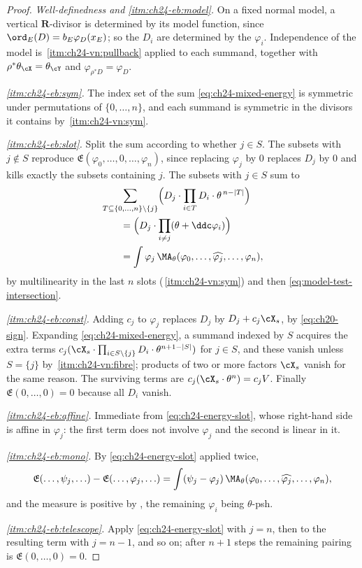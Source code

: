 \begin{proof}
\emph{Well-definedness and \cref{itm:ch24-eb:model}.}  On a fixed normal model,
a vertical $\mathbf R$-divisor is determined by its model function, since
$\ord_E(D)=b_E\varphi_D(x_E)$; so the $D_i$ are determined by the
$\varphi_i$.  Independence of the model is
\,\cref{itm:ch24-vn:pullback} applied to each
summand, together with $\rho^*\theta_{\cX}=\theta_{\cY}$ and
$\varphi_{\rho^*D}=\varphi_D$.

\emph{\cref{itm:ch24-eb:sym}.}  The index set of the sum
\eqref{eq:ch24-mixed-energy} is symmetric under permutations of
$\{0,\ldots,n\}$, and each summand is symmetric in the divisors it
contains by \,\cref{itm:ch24-vn:sym}.

\emph{\cref{itm:ch24-eb:slot}.}  Split the sum according to whether
$j\in S$.  The subsets with $j\notin S$ reproduce
$\mathfrak E(\varphi_0,\ldots,0,\ldots,\varphi_n)$, since replacing
$\varphi_j$ by $0$ replaces $D_j$ by $0$ and kills exactly the
subsets containing $j$.  The subsets with $j\in S$ sum to
\[
 \begin{aligned}
 &\sum_{T\subseteq\{0,\ldots,n\}\setminus\{j\}}
  \Bigl(D_j\cdot\prod_{i\in T}D_i\cdot\theta^{\,n-|T|}\Bigr)\\
 &\qquad=\Bigl(D_j\cdot\prod_{i\neq j}(\theta+\ddc\varphi_i)\Bigr)\\
 &\qquad=\int\varphi_j\,\MA_\theta
   (\varphi_0,\ldots,\widehat{\varphi_j},\ldots,\varphi_n),
 \end{aligned}
\]
by multilinearity in the last $n$ slots
(\,\cref{itm:ch24-vn:sym}) and then
\eqref{eq:model-test-intersection}.

\emph{\cref{itm:ch24-eb:const}.}  Adding $c_j$ to $\varphi_j$ replaces
$D_j$ by $D_j+c_j\cX_s$, by \eqref{eq:ch20-sign}.  Expanding
\eqref{eq:ch24-mixed-energy}, a summand indexed by $S$ acquires the extra
terms
$c_j(\cX_s\cdot\prod_{i\in S\setminus\{j\}}D_i\cdot\theta^{n+1-|S|})$ for
$j\in S$, and these vanish unless $S=\{j\}$ by
\,\cref{itm:ch24-vn:fibre}; products of two
or more factors $\cX_s$ vanish for the same reason.  The surviving terms
are $c_j(\cX_s\cdot\theta^n)=c_jV$.  Finally
$\mathfrak E(0,\ldots,0)=0$ because all $D_i$ vanish.

\emph{\cref{itm:ch24-eb:affine}.}  Immediate from
\eqref{eq:ch24-energy-slot}, whose right-hand side is affine in
$\varphi_j$: the first term does not involve $\varphi_j$ and the second
is linear in it.

\emph{\cref{itm:ch24-eb:mono}.}  By \eqref{eq:ch24-energy-slot} applied
twice,
\[
 \mathfrak E(\ldots,\psi_j,\ldots)-\mathfrak E(\ldots,\varphi_j,\ldots)
 =\int(\psi_j-\varphi_j)\,
   \MA_\theta(\varphi_0,\ldots,\widehat{\varphi_j},\ldots,\varphi_n),
\]
and the measure is positive by , the remaining
$\varphi_i$ being $\theta$-psh.

\emph{\cref{itm:ch24-eb:telescope}.}  Apply \eqref{eq:ch24-energy-slot} with
$j=n$, then to the resulting term with $j=n-1$, and so on; after $n+1$
steps the remaining pairing is $\mathfrak E(0,\ldots,0)=0$.
\end{proof}

